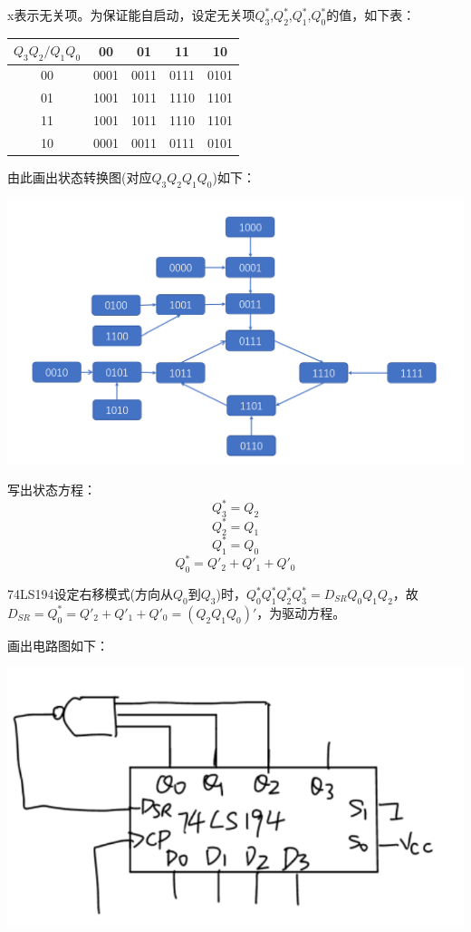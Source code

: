\documentclass{ctexart}
\begin{document}
    x表示无关项。为保证能自启动，设定无关项$Q^*_3$,$Q^*_2$,$Q^*_1$,$Q^*_0$的值，如下表：
    
    \begin{table}[!ht]
    \centering
    \begin{tabular}{|c|c|c|c|c|}
    \hline
    $Q_3Q_2/Q_1Q_0$ & 00   & 01   & 11   & 10   \\ \hline
    00              & 0001 & 0011 & 0111 & 0101 \\ \hline
    01              & 1001 & 1011 & 1110 & 1101 \\ \hline
    11              & 1001 & 1011 & 1110 & 1101 \\ \hline
    10              & 0001 & 0011 & 0111 & 0101 \\ \hline
    \end{tabular}
    \end{table}

    由此画出状态转换图(对应$Q_3$$Q_2$$Q_1$$Q_0$)如下：
    
    \begin{minipage}[c]{0.9\textwidth}
        \centering
        \includegraphics[width=\linewidth]{思考题.png} 
    \end{minipage}

    写出状态方程：
    $$Q^*_3=Q_2$$
    $$Q^*_2=Q_1$$
    $$Q^*_1=Q_0$$
    $$Q^*_0=Q'_2+Q'_1+Q'_0$$

    74LS194设定右移模式(方向从$Q_0$到$Q_3$)时，$Q^*_0Q^*_1Q^*_2Q^*_3=D_{SR}Q_0Q_1Q_2$，故$D_{SR}=Q^*_0=Q'_2+Q'_1+Q'_0=(Q_2Q_1Q_0)'$，为驱动方程。

    画出电路图如下：

    \begin{minipage}[c]{0.9\textwidth}
        \centering
        \includegraphics[width=\linewidth]{思考题2.png} 
    \end{minipage}

    
    
\end{document}
